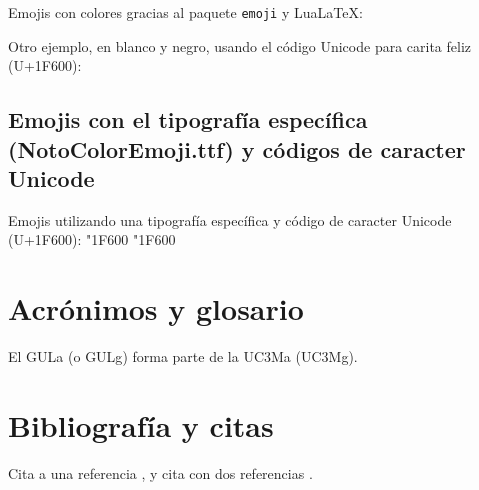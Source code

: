 Emojis con colores gracias al paquete \texttt{emoji} y LuaLaTeX:

Otro ejemplo, en blanco y negro, usando el código Unicode para carita feliz (U+1F600): {}


\subsection{Emojis con el tipografía específica (NotoColorEmoji.ttf) y códigos de caracter Unicode}

\newfontfamily{}

Emojis utilizando una tipografía específica y código de caracter Unicode (U+1F600):
{\emojifont \Uchar"1F600 \char"1F600}



\section{Acrónimos y glosario}

El \gls{GULa} (o \gls{GULg}) forma parte de la \gls{UC3Ma} (\gls{UC3Mg}).



\section{Bibliografía y citas}

Cita a una referencia \cite{prieto2014applications}, y cita con dos referencias \cite{prieto2014applications, gonzalez2020simultaneous}.
